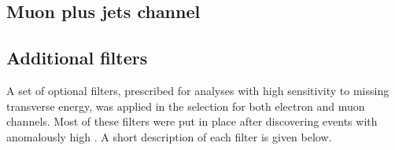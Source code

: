 
\subsection{Muon plus jets channel}
\label{ss_xsection:mujets}


\subsection{Additional filters}
\label{ss_xsection:met_filters}

A set of optional filters, prescribed for analyses with high sensitivity to missing transverse energy, was applied in
the selection for both electron and muon channels. Most of these filters were put in place after discovering events with
anomalously high \MET. A short description of each filter is given below.

